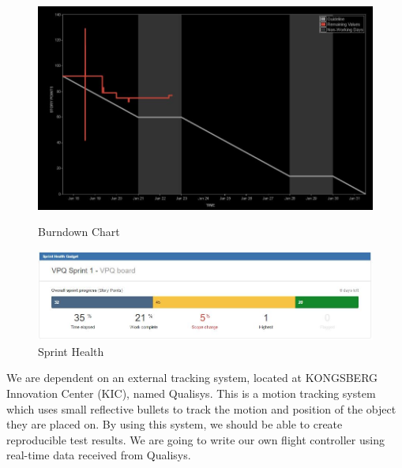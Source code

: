 \begin{figure}[h]
        \centering
         \begin{minipage}[b]{0.3\textwidth}
            \includegraphics[width = 1\textwidth]{VAPIQ-PICTURES/BDC}
            \caption{Burndown Chart}
            \label{fig:bdc}
        \end{minipage}
        \hfill
        \begin{minipage}[b]{0.6\textwidth}
            \includegraphics[width = 1\textwidth]{VAPIQ-PICTURES/SH}
            \caption{Sprint Health}
            \label{fig:sh}
        \end{minipage}
\end{figure}


\vspace*{1cm}
\noindent
We are dependent on an external tracking system, located at KONGSBERG Innovation Center (KIC), named Qualisys. This is a motion tracking system which uses small reflective bullets to track the motion and position of the object they are placed on. By using this system, we should be able to create reproducible test results. We are going to write our own flight controller using real-time data received from Qualisys. 
\\ 

